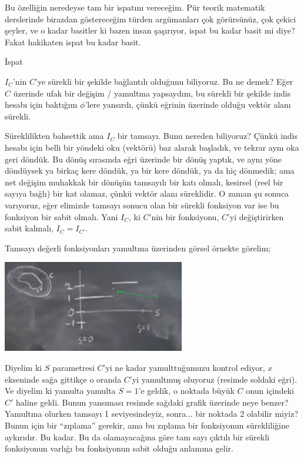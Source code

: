\documentclass[12pt,fleqn]{article}\usepackage{../../common}
\begin{document}
Bu özelliğin neredeyse tam bir ispatını vereceğim. Pür teorik matematik
derslerinde birazdan göstereceğim türden argümanları çok görürsünüz, çok çekici
şeyler, ve o kadar basitler ki bazen insan şaşırıyor, ispat bu kadar basit mi
diye? Fakat hakikaten ispat bu kadar basit.

İspat

$I_C$'nin $C$'ye sürekli bir şekilde bağlantılı olduğunu biliyoruz. Bu ne demek?
Eğer $C$ üzerinde ufak bir değişim / yamultma yapsaydım, bu sürekli bir şekilde
indis hesabı için baktığım $\phi$'lere yansırdı, çünkü eğrinin üzerinde olduğu
vektör alanı sürekli.

Süreklilikten bahsettik ama $I_C$ bir tamsayı. Bunu nereden biliyoruz? Çünkü
indis hesabı için belli bir yöndeki oku (vektörü) baz alarak başladık, ve
tekrar aynı oka geri döndük. Bu dönüş sırasında eğri üzerinde bir dönüş yaptık,
ve aynı yöne döndüysek ya birkaç kere döndük, ya bir kere döndük, ya da hiç
dönmedik; ama net değişim muhakkak bir dönüşün tamsayılı bir katı olmalı,
kesirsel (reel bir sayıya bağlı) bir kat olamaz, çünkü vektör alanı
süreklidir. O zaman şu sonuca varıyoruz, eğer elimizde tamsayı sonucu olan bir
sürekli fonksiyon var ise bu fonksiyon bir sabit olmalı. Yani $I_C$, ki $C$'nin
bir fonksiyonu, $C$'yi değiştirirken sabit kalmalı, $I_C = I_{C'}$.

Tamsayı değerli fonksiyonları yamultma üzerinden görsel örnekte görelim;

\includegraphics[height=4cm]{08_28.png}

Diyelim ki $S$ parametresi $C$'yi ne kadar yamulttuğumuzu kontrol ediyor, $x$
ekseninde sağa gittikçe o oranda $C$'yi yamultmuş oluyoruz (resimde soldaki
eğri). Ve diyelim ki yamulta yamulta $S=1$'e geldik, o noktada büyük $C$ onun
içindeki $C'$ haline geldi. Bunun yansıması resimde sağdaki grafik üzerinde neye
benzer? Yamultma olurken tamsayı 1 seviyesindeyiz, sonra... bir noktada 2
olabilir miyiz? Bunun için bir ``zıplama'' gerekir, ama bu zıplama bir
fonksiyonun sürekliliğine aykırıdır. Bu kadar. Bu da olamayacağına göre tam sayı
çıktılı bir sürekli fonksiyonun varlığı bu fonksiyonun sabit olduğu anlamına
gelir.
\end{document}
